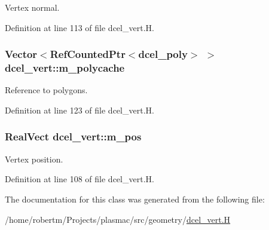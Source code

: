 Vertex normal. 



Definition at line 113 of file dcel\+\_\+vert.\+H.

\subsubsection[{\texorpdfstring{m\+\_\+polycache}{m_polycache}}]{\setlength{\rightskip}{0pt plus 5cm}Vector$<$Ref\+Counted\+Ptr$<${\bf dcel\+\_\+poly}$>$ $>$ dcel\+\_\+vert\+::m\+\_\+polycache\hspace{0.3cm}{\ttfamily [protected]}}\hypertarget{classdcel__vert_a93d796da8f2519f6e9d8ff0197f6e673}{}\label{classdcel__vert_a93d796da8f2519f6e9d8ff0197f6e673}


Reference to polygons. 



Definition at line 123 of file dcel\+\_\+vert.\+H.

\subsubsection[{\texorpdfstring{m\+\_\+pos}{m_pos}}]{\setlength{\rightskip}{0pt plus 5cm}Real\+Vect dcel\+\_\+vert\+::m\+\_\+pos\hspace{0.3cm}{\ttfamily [protected]}}\hypertarget{classdcel__vert_a837cb5cc7a7bc802a9a372a9e6d9263a}{}\label{classdcel__vert_a837cb5cc7a7bc802a9a372a9e6d9263a}


Vertex position. 



Definition at line 108 of file dcel\+\_\+vert.\+H.



The documentation for this class was generated from the following file\+:\begin{DoxyCompactItemize}
\item 
/home/robertm/\+Projects/plasmac/src/geometry/\hyperlink{dcel__vert_8H}{dcel\+\_\+vert.\+H}\end{DoxyCompactItemize}
